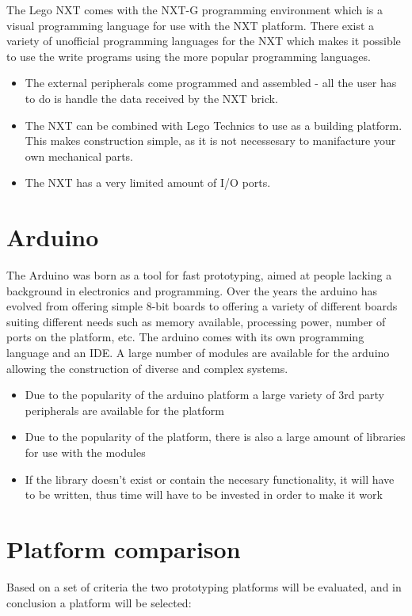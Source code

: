 The Lego NXT comes with the NXT-G programming environment which is a visual
programming language for use with the NXT platform. There exist a variety of
unofficial programming languages for the NXT which makes it possible to use the
write programs using the more popular programming languages.

\begin{itemize}
  \item The external peripherals come programmed and assembled - all the user
  has to do is handle the data received by the NXT brick.
  \item The NXT can be combined with Lego Technics to use as a building
  platform. This makes construction simple, as it is not necessesary to
  manifacture your own mechanical parts.
  \item The NXT has a very limited amount of I/O ports.
\end{itemize}

\section{Arduino}
The Arduino was born as a tool for fast prototyping, aimed at people lacking a
background in electronics and programming. Over the years the arduino has
evolved from offering simple 8-bit boards to offering a variety of different
boards suiting different needs such as memory available, processing power,
number of ports on the platform, etc. The arduino comes with its own
programming language and an IDE. A large number of modules are available for
the arduino allowing the construction of diverse and complex systems\Source.

\begin{itemize}
	\item Due to the popularity of the arduino platform a large variety of 3rd
	party peripherals are available for the platform
	\item Due to the popularity of the platform, there is also a large amount of
	libraries for use with the modules
	\item If the library doesn't exist or contain the necesary functionality, it
	will have to be written, thus time will have to be invested in order to make
	it work
\end{itemize}

\section{Platform comparison}
Based on a set of criteria the two prototyping platforms will be evaluated, and
in conclusion a platform will be selected:


